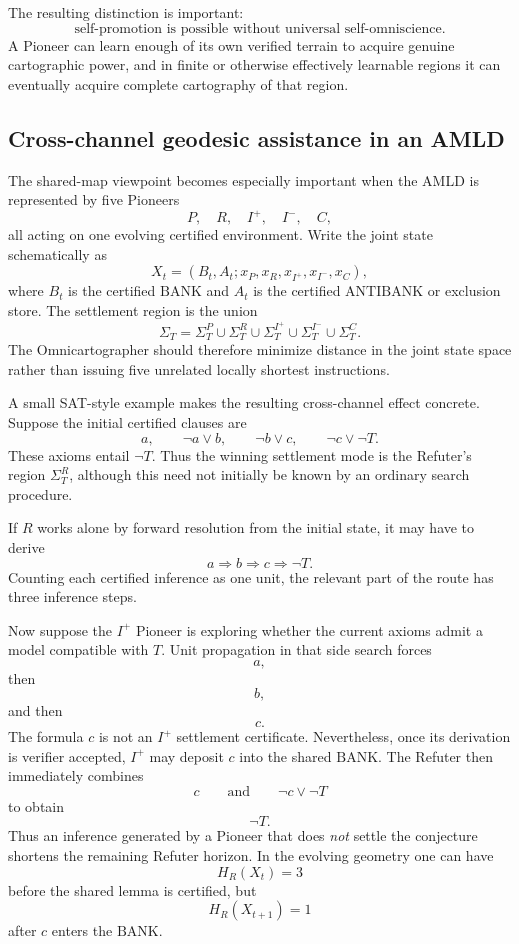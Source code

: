 \documentclass[11pt]{article}
\newcommand{\BANK}{\mathrm{BANK}}
\begin{document}
The resulting distinction is important:
\[
\boxed{\text{self-promotion is possible without universal self-omniscience}.}
\]
A Pioneer can learn enough of its own verified terrain to acquire genuine cartographic power, and in finite or otherwise effectively learnable regions it can eventually acquire complete cartography of that region.

\subsection{Cross-channel geodesic assistance in an AMLD}
The shared-map viewpoint becomes especially important when the AMLD is represented by five Pioneers
\[
P,\quad R,\quad I^+,\quad I^-,\quad C,
\]
all acting on one evolving certified environment.  Write the joint state schematically as
\[
X_t=(B_t,A_t;x_P,x_R,x_{I^+},x_{I^-},x_C),
\]
where $B_t$ is the certified $\BANK$ and $A_t$ is the certified \(\mathrm{ANTIBANK}\) or exclusion store.  The settlement region is the union
\[
\Sigma_T=\Sigma_T^P\cup\Sigma_T^R\cup\Sigma_T^{I^+}\cup\Sigma_T^{I^-}\cup\Sigma_T^C.
\]
The Omnicartographer should therefore minimize distance in the joint state space rather than issuing five unrelated locally shortest instructions.

A small SAT-style example makes the resulting cross-channel effect concrete.  Suppose the initial certified clauses are
\[
a,\qquad \neg a\lor b,\qquad \neg b\lor c,\qquad \neg c\lor\neg T.
\]
These axioms entail $\neg T$.  Thus the winning settlement mode is the Refuter's region $\Sigma_T^R$, although this need not initially be known by an ordinary search procedure.

If $R$ works alone by forward resolution from the initial state, it may have to derive
\[
a\Longrightarrow b\Longrightarrow c\Longrightarrow \neg T.
\]
Counting each certified inference as one unit, the relevant part of the route has three inference steps.

Now suppose the $I^+$ Pioneer is exploring whether the current axioms admit a model compatible with $T$.  Unit propagation in that side search forces
\[
a,
\]
then
\[
b,
\]
and then
\[
c.
\]
The formula $c$ is not an $I^+$ settlement certificate.  Nevertheless, once its derivation is verifier accepted, $I^+$ may deposit $c$ into the shared $\BANK$.  The Refuter then immediately combines
\[
c
\qquad\text{and}\qquad
\neg c\lor\neg T
\]
to obtain
\[
\neg T.
\]
Thus an inference generated by a Pioneer that does \emph{not} settle the conjecture shortens the remaining Refuter horizon.  In the evolving geometry one can have
\[
H_R(X_t)=3
\]
before the shared lemma is certified, but
\[
H_R(X_{t+1})=1
\]
after $c$ enters the $\BANK$.
\end{document}
